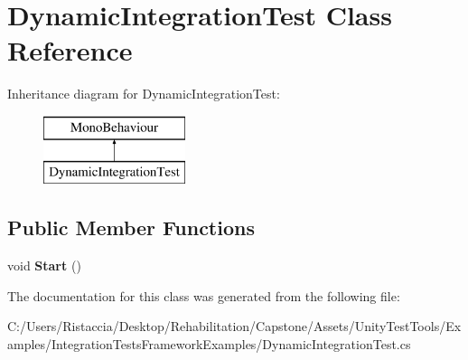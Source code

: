 \hypertarget{class_dynamic_integration_test}{}\section{Dynamic\+Integration\+Test Class Reference}
\label{class_dynamic_integration_test}
Inheritance diagram for Dynamic\+Integration\+Test\+:\begin{figure}[H]
\begin{center}
\leavevmode
\includegraphics[height=2.000000cm]{class_dynamic_integration_test}
\end{center}
\end{figure}
\subsection*{Public Member Functions}
\begin{DoxyCompactItemize}
\item 
\mbox{\label{class_dynamic_integration_test_a9db73ad7ae55b8db45c87913f31dc642}} 
void {\bfseries Start} ()
\end{DoxyCompactItemize}


The documentation for this class was generated from the following file\+:\begin{DoxyCompactItemize}
\item 
C\+:/\+Users/\+Ristaccia/\+Desktop/\+Rehabilitation/\+Capstone/\+Assets/\+Unity\+Test\+Tools/\+Examples/\+Integration\+Tests\+Framework\+Examples/Dynamic\+Integration\+Test.\+cs\end{DoxyCompactItemize}
